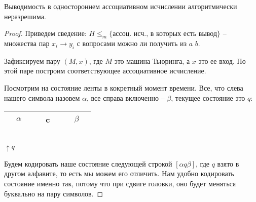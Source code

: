 \begin{theorem}
    Выводимость в одностороннем ассоциативном исчислении алгоритмически неразрешима.
\end{theorem}
\begin{proof}
    Приведем сведение: $H \leqslant_m \{\text{ассоц. исч., в которых есть вывод}\}$ -- множества пар $x_i \to y_i$ с вопросами можно ли получить из $a$ $b$.

    Зафиксируем пару $(M, x)$, где $M$ это машина Тьюринга, а $x$ это ее вход. По этой паре построим соответствующее ассоциативное исчисление.

    Посмотрим на состояние ленты в кокретный момент времени. Все, что слева нашего символа назовем $\alpha$, все справа включенно -- $\beta$, текущее состояние это $q$: 
    \begin{center}
        \begin{tabular}{|c|c|c|c|c|c|c|c|c|}
            \hline
             & $\alpha$ &  &  & c &  &  & $\beta$ & \\
            \hline
        \end{tabular}\\
        $\uparrow q$
    \end{center}
    Будем кодировать наше состояние следующей строкой $[\alpha q \beta]$, где $q$ взято в другом алфавите, то есть мы можем его отличить. 
    Нам удобно кодировать состояние именно так, потому что при сдвиге головки, оно будет меняться буквально на пару символов.


\end{proof}
